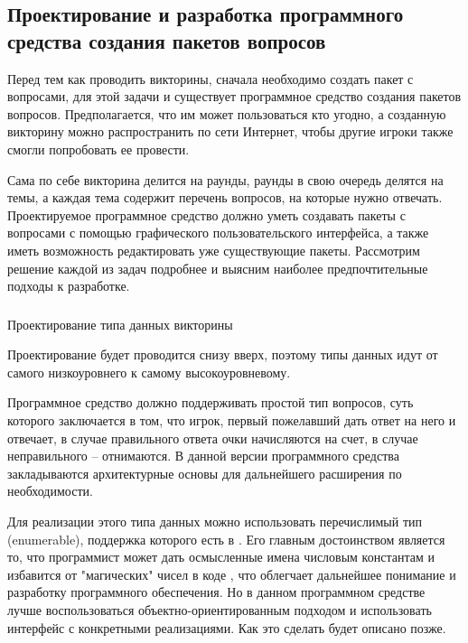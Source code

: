 \subsection{Проектирование и разработка программного средства создания пакетов вопросов}
\label{sec:design:tester}

Перед тем как проводить викторины, сначала необходимо создать пакет с вопросами, для этой задачи и существует программное средство создания пакетов вопросов. Предполагается, что им
может пользоваться кто угодно, а созданную викторину можно распространить по сети Интернет, чтобы другие игроки также смогли попробовать ее провести.

Сама по себе викторина делится на раунды, раунды в свою очередь делятся на темы, а каждая тема содержит перечень вопросов, на которые нужно отвечать. Проектируемое программное
средство должно уметь создавать пакеты с вопросами с помощью графического пользовательского интерфейса, а также иметь возможность редактировать уже существующие пакеты. Рассмотрим
решение каждой из задач подробнее и выясним наиболее предпочтительные подходы к разработке.

\subsubsection{} Проектирование типа данных викторины
\label{sec:design:tester:data}

Проектирование будет проводится снизу вверх, поэтому типы данных идут от самого низкоуровнего к самому высокоуровневому.

Программное средство должно поддерживать простой тип вопросов, суть которого заключается в том, что игрок, 
первый пожелавший дать ответ на него и отвечает, в случае правильного ответа очки начисляются на счет, в случае неправильного -- отнимаются.
В данной версии программного средства закладываются архитектурные основы для дальнейшего расширения по необходимости.

Для реализации этого типа данных можно использовать перечислимый тип (enumerable), поддержка которого есть в \csharp. Его главным достоинством является то, что программист может 
дать осмысленные имена числовым константам и избавится от "магических" чисел в коде \cite{book_makkonel}, что облегчает дальнейшее понимание и разработку программного обеспечения. Но в данном программном средстве
лучше воспользоваться объектно-ориентированным подходом и использовать интерфейс с конкретными реализациями. Как это сделать будет описано позже.

